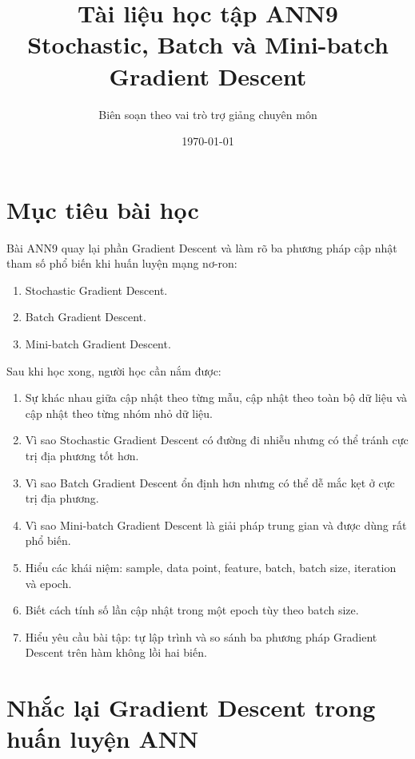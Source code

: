 \documentclass[12pt,a4paper]{report}
\title{
    \textbf{Tài liệu học tập ANN9}\\
    \large Stochastic, Batch và Mini-batch Gradient Descent
}
\author{Biên soạn theo vai trò trợ giảng chuyên môn}
\date{\today}
\begin{document}
\maketitle
\tableofcontents
\newpage

\chapter*{Mục tiêu bài học}

Bài ANN9 quay lại phần Gradient Descent và làm rõ ba phương pháp cập nhật tham số phổ biến khi huấn luyện mạng nơ-ron:

\begin{enumerate}[label=\arabic*.]
    \item Stochastic Gradient Descent.
    \item Batch Gradient Descent.
    \item Mini-batch Gradient Descent.
\end{enumerate}

Sau khi học xong, người học cần nắm được:

\begin{enumerate}[label=\arabic*.]
    \item Sự khác nhau giữa cập nhật theo từng mẫu, cập nhật theo toàn bộ dữ liệu và cập nhật theo từng nhóm nhỏ dữ liệu.
    \item Vì sao Stochastic Gradient Descent có đường đi nhiễu nhưng có thể tránh cực trị địa phương tốt hơn.
    \item Vì sao Batch Gradient Descent ổn định hơn nhưng có thể dễ mắc kẹt ở cực trị địa phương.
    \item Vì sao Mini-batch Gradient Descent là giải pháp trung gian và được dùng rất phổ biến.
    \item Hiểu các khái niệm: sample, data point, feature, batch, batch size, iteration và epoch.
    \item Biết cách tính số lần cập nhật trong một epoch tùy theo batch size.
    \item Hiểu yêu cầu bài tập: tự lập trình và so sánh ba phương pháp Gradient Descent trên hàm không lồi hai biến.
\end{enumerate}

\chapter{Nhắc lại Gradient Descent trong huấn luyện ANN}
\end{document}

